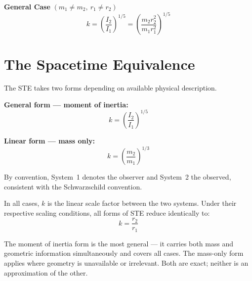 \documentclass[12pt,a4paper]{article}
\begin{document}
\textbf{General Case} $(m_1 \neq m_2,\ r_1 \neq r_2)$
\begin{equation}
k = \left(\frac{I_2}{I_1}\right)^{1/5} = \left(\frac{m_2 r_2^2}{m_1 r_1^2}\right)^{1/5}
\end{equation}

\newpage

\begin{abstract}
A single generalized expression --- the Spacetime Equivalence (STE) --- is shown to produce both the Lorentz factor and the Schwarzschild metric time dilation term as exact special cases. The STE yields the linear scale factor between any two physical systems, and all three of its forms reduce to a ratio of radii under their respective conditions. Both classical relativistic results emerge from this expression without additional parameters, geometric similarity, or domain restrictions. Internal consistency is demonstrated by independent two-path verification.
\end{abstract}

\section{The Spacetime Equivalence}

The STE takes two forms depending on available physical description.

\textbf{General form --- moment of inertia:}
\begin{equation}
\boxed{k = \left(\frac{I_2}{I_1}\right)^{1/5}}
\end{equation}

\textbf{Linear form --- mass only:}
\begin{equation}
\boxed{k = \left(\frac{m_2}{m_1}\right)^{1/3}}
\end{equation}

By convention, System~1 denotes the observer and System~2 the observed, consistent with the Schwarzschild convention.

In all cases, $k$ is the linear scale factor between the two systems. Under their respective scaling conditions, all forms of STE reduce identically to:
\begin{equation}
k = \frac{r_2}{r_1}
\end{equation}

The moment of inertia form is the most general --- it carries both mass and geometric information simultaneously and covers all cases. The mass-only form applies where geometry is unavailable or irrelevant. Both are exact; neither is an approximation of the other.
\end{document}
